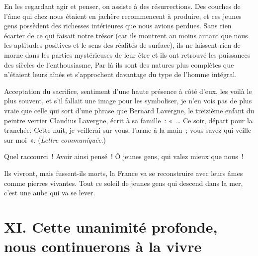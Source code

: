 \documentclass[french,twoside]{book} %
\newcommand\chapteropen{} %
\newcommand\chapterclose{} %
\begin{document}
En les regardant agir et penser, on assiste à des résurrections. Des couches de l’âme qui chez nous étaient en jachère recommencent à produire, et ces jeunes gens possèdent des richesses intérieures que nous avions perdues. Sans rien écarter de ce qui faisait notre trésor (car ils montrent au moins autant que nous les aptitudes positives et le sens des réalités de surface), ils ne laissent rien de morne dans les parties mystérieuses de leur être et ils ont retrouvé les puissances des siècles de l’enthousiasme, Par là ils sont des natures plus complètes que n’étaient leurs aînés et s’approchent davantage du type de l’homme intégral.‌\par
Acceptation du sacrifice, sentiment d’une haute présence à côté d’eux, les voilà le plus souvent, et s’il fallait une image pour les symboliser, je n’en vois pas de plus vraie que celle qui sort d’une phrase que Bernard Lavergne, le treizième enfant du peintre verrier Claudius Lavergne, écrit à sa famille : « … Ce soir, départ pour la tranchée. Cette nuit, je veillerai sur vous, l’arme à la main ; vous savez qui veille sur moi ». ({\itshape Lettre communiquée}.)‌\par
Quel raccourci ! Avoir ainsi pensé ! Ô jeunes gens, qui valez mieux que nous !‌\par
Ils vivront, mais fussent-ils morts, la France va se reconstruire avec leurs âmes comme pierres vivantes. Tout ce soleil de jeunes gens qui descend dans la mer, c’est une aube qui va se lever.‌
\chapterclose


\chapteropen
\chapter[XI. Cette unanimité profonde, nous continuerons à la vivre‌]{XI. Cette unanimité profonde, nous continuerons à la vivre‌}\renewcommand{\leftmark}{XI. Cette unanimité profonde, nous continuerons à la vivre‌}
\end{document}
